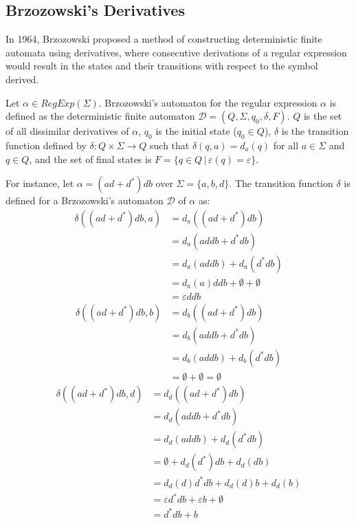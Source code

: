 \subsection{Brzozowski's Derivatives}
In 1964, Brzozowski \cite{brzozowski_derivatives} proposed a method of constructing deterministic finite automata using derivatives, where consecutive derivations of a regular expression would result in the states and their transitions with respect to the symbol derived.

\begin{defn}
	Let $\alpha \in RegExp(\Sigma)$. Brzozowski's automaton for the regular expression $\alpha$ is defined as the deterministic finite automaton $\mathcal{D} = (Q, \Sigma, q_0, \delta, F)$. $Q$ is the set of all dissimilar derivatives of $\alpha$, $q_0$ is the initial state ($q_0 \in Q$), $\delta$ is the transition function defined by $\delta: Q \times \Sigma \rightarrow Q$ such that $\delta (q,a) = d_a(q)$ for all $a \in \Sigma$ and $q \in Q$, and the set of final states is $F = \{q \in Q \, | \, \varepsilon(q) = \varepsilon\}$.
\end{defn}

For instance, let $\alpha = (ad+d^*)db$ over $\Sigma = \{a,b,d\}$. The transition function $\delta$ is defined for a Brzozowski's automaton $\mathcal{D}$ of $\alpha$ as:
\begin{align*}
	\delta((ad + d^*)db, a) &= d_a((ad + d^*)db) \\
	&= d_a(addb + d^*db) \\
	&= d_a(addb) + d_a(d^*db) \\
	&= d_a(a)ddb + \emptyset + \emptyset \\
	&= \varepsilon ddb
\end{align*}
\begin{align*}
	\delta((ad + d^*)db, b) &= d_b((ad + d^*)db) \\
	&= d_b(addb + d^*db) \\
	&= d_b(addb) + d_b(d^*db) \\
	&= \emptyset + \emptyset = \emptyset
\end{align*}
\begin{align*}
	\delta((ad + d^*)db, d) &= d_d((ad + d^*)db) \\
	&= d_d(addb + d^*db) \\
	&= d_d(addb) + d_d(d^*db) \\
	&= \emptyset + d_d(d^*)db + d_d(db) \\
	&= d_d(d)d^*db + d_d(d)b + d_d(b) \\
	&= \varepsilon d^*db + \varepsilon b + \emptyset \\
	&= d^*db + b
\end{align*}

